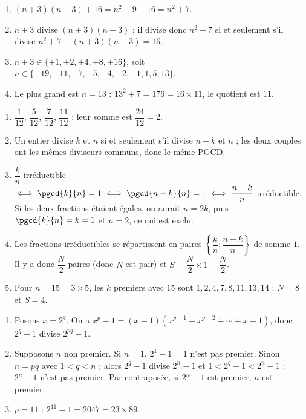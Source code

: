 \begin{corrige}
\begin{sol}
\begin{enumerate}
\item $(n+3)(n-3) + 16 = n^2 - 9 + 16 = n^2 + 7$.
\item $n + 3$ divise $(n+3)(n-3)$ ; il divise donc $n^2 + 7$ si et seulement s'il divise $n^2 + 7 - (n+3)(n-3) = 16$.
\item $n + 3 \in \{\pm 1, \pm 2, \pm 4, \pm 8, \pm 16\}$, soit $n \in \{-19, -11, -7, -5, -4, -2, -1, 1, 5, 13\}$.
\item Le plus grand est $n = 13$ : $13^2 + 7 = 176 = 16 \times 11$, le quotient est $11$.
\end{enumerate}
\end{sol}
%
\begin{sol}
\begin{enumerate}
\item $\dfrac{1}{12}$, $\dfrac{5}{12}$, $\dfrac{7}{12}$, $\dfrac{11}{12}$ ; leur somme est $\dfrac{24}{12} = 2$.
\item Un entier divise $k$ et $n$ si et seulement s'il divise $n - k$ et $n$ ; les deux couples ont les m\^emes diviseurs communs, donc le m\^eme PGCD.
\item $\dfrac{k}{n}$ irr\'eductible $\iff \pgcd{k}{n} = 1 \iff \pgcd{n-k}{n} = 1 \iff \dfrac{n-k}{n}$ irr\'eductible.
      Si les deux fractions \'etaient \'egales, on aurait $n = 2k$, puis $\pgcd{k}{n} = k = 1$ et $n = 2$, ce qui est exclu.
\item Les fractions irr\'eductibles se r\'epartissent en paires $\left\lbrace \dfrac{k}{n} ; \dfrac{n-k}{n} \right\rbrace$ de somme $1$.
      Il y a donc $\dfrac{N}{2}$ paires (donc $N$ est pair) et $S = \dfrac{N}{2} \times 1 = \dfrac{N}{2}$.
\item Pour $n = 15 = 3 \times 5$, les $k$ premiers avec $15$ sont $1, 2, 4, 7, 8, 11, 13, 14$ : $N = 8$ et $S = 4$.
\end{enumerate}
\end{sol}
%
\begin{sol}
\begin{enumerate}
\item Posons $x = 2^q$. On a $x^p - 1 = (x - 1)(x^{p-1} + x^{p-2} + \cdots + x + 1)$, donc $2^q - 1$ divise $2^{pq} - 1$.
\item Supposons $n$ non premier. Si $n = 1$, $2^1 - 1 = 1$ n'est pas premier. Sinon $n = pq$ avec $1 < q < n$ ;
      alors $2^q - 1$ divise $2^n - 1$ et $1 < 2^q - 1 < 2^n - 1$ : $2^n - 1$ n'est pas premier.
      Par contrapos\'ee, si $2^n - 1$ est premier, $n$ est premier.
\item $p = 11$ : $2^{11} - 1 = 2047 = 23 \times 89$.

\end{enumerate}
\end{sol}
\end{corrige}

